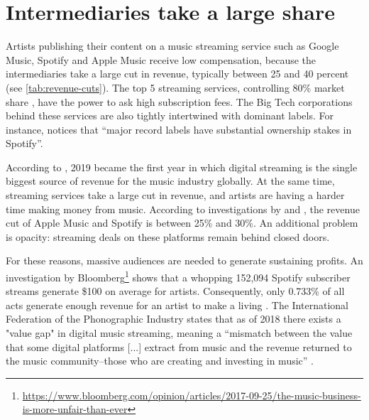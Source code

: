\section{Intermediaries take a large share}
Artists publishing their content on a music streaming service such as Google Music, Spotify and Apple Music receive low compensation, because the intermediaries take a large cut in revenue, typically between 25 and 40 percent (see \ref{tab:revenue-cuts}). The top 5 streaming services, controlling 80\% market share \citep{midiamarketshare2020}, have the power to ask high subscription fees. The Big Tech corporations behind these services are also tightly intertwined with dominant labels. For instance, \cite{aguiar2018platforms} notices that ``major record labels have substantial ownership stakes in Spotify''.

According to \cite{ifpi2020global}, 2019 became the first year in which digital streaming is the single biggest source of revenue for the music industry globally. At the same time, streaming services take a large cut in revenue, and artists are having a harder time making money from music. According to investigations by \cite{chris2018dissecting} and \cite{recode2015}, the revenue cut of Apple Music and Spotify is between 25\% and 30\%. An additional problem is opacity: streaming deals on these platforms remain behind closed doors. 

For these reasons, massive audiences are needed to generate sustaining profits. An investigation by Bloomberg\footnote{\url{https://www.bloomberg.com/opinion/articles/2017-09-25/the-music-business-is-more-unfair-than-ever}} shows that a whopping 152,094 Spotify subscriber streams generate \$100 on average for artists. Consequently, only 0.733\% of all acts generate enough revenue for an artist to make a living \citep{ingham2018odds}. The International Federation of the Phonographic Industry states that as of 2018 there exists a "value gap" in digital music streaming, meaning a ``mismatch between the value that some digital platforms [...] extract from music and the revenue returned to the music community–those who are creating and investing in music'' \citep{ifpi2018global}.


